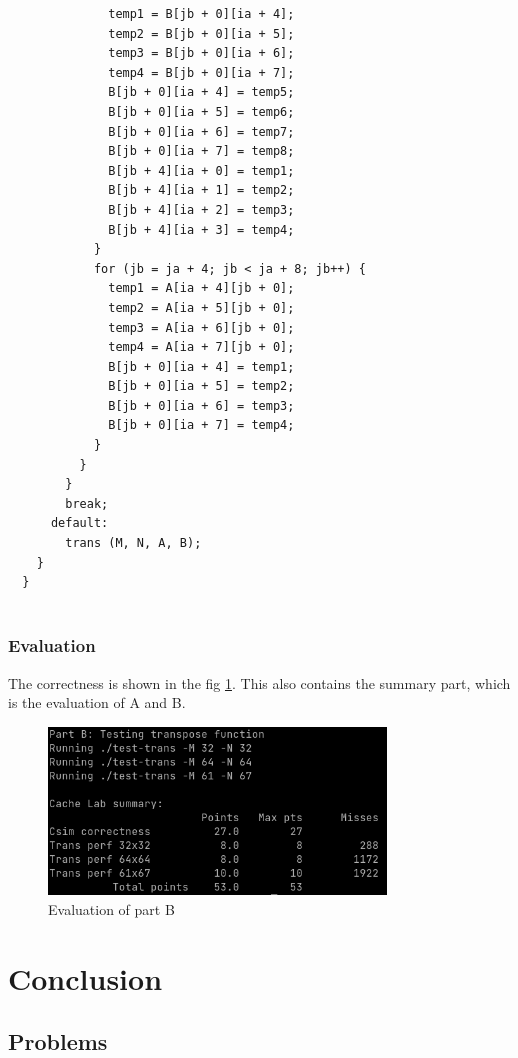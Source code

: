 \documentclass{article}
\begin{document}
\begin{lstlisting}
              temp1 = B[jb + 0][ia + 4];
              temp2 = B[jb + 0][ia + 5];
              temp3 = B[jb + 0][ia + 6];
              temp4 = B[jb + 0][ia + 7];
              B[jb + 0][ia + 4] = temp5;
              B[jb + 0][ia + 5] = temp6;
              B[jb + 0][ia + 6] = temp7;
              B[jb + 0][ia + 7] = temp8;
              B[jb + 4][ia + 0] = temp1;
              B[jb + 4][ia + 1] = temp2;
              B[jb + 4][ia + 2] = temp3;
              B[jb + 4][ia + 3] = temp4;
            }
            for (jb = ja + 4; jb < ja + 8; jb++) {
              temp1 = A[ia + 4][jb + 0];
              temp2 = A[ia + 5][jb + 0];
              temp3 = A[ia + 6][jb + 0];
              temp4 = A[ia + 7][jb + 0];
              B[jb + 0][ia + 4] = temp1;
              B[jb + 0][ia + 5] = temp2;
              B[jb + 0][ia + 6] = temp3;
              B[jb + 0][ia + 7] = temp4;
            }
          }
        }
        break;
      default:
        trans (M, N, A, B);
    }
  }
  
\end{lstlisting}

\subsubsection{Evaluation}

The correctness is shown in the fig \ref{fig:evalB}. This also contains the summary part, which is the evaluation of A and B.

\begin{figure}[H]
    \centering
    \includegraphics[width=0.8\textwidth]{5.png}
    \caption{Evaluation of part B}
    \label{fig:evalB}
\end{figure}

\section{Conclusion}

\subsection{Problems}
\end{document}

